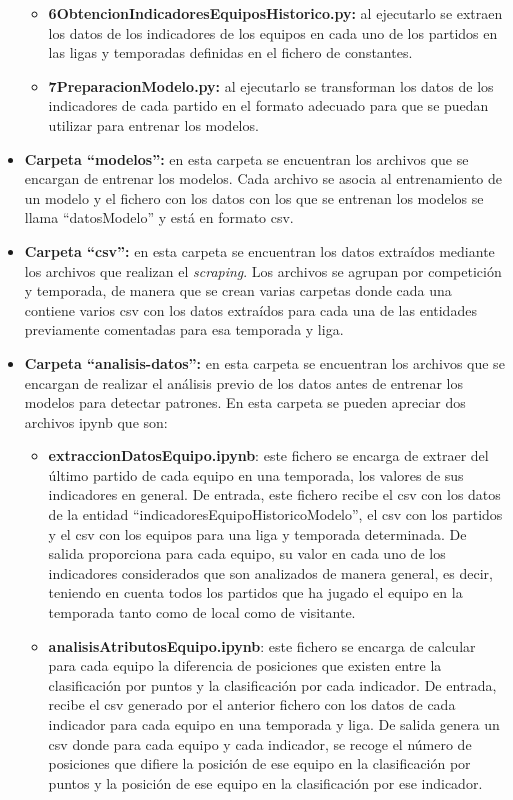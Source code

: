 \begin{itemize}
\begin{itemize}
              \item \textbf{6ObtencionIndicadoresEquiposHistorico.py:} al ejecutarlo se extraen los datos de los indicadores de los equipos en cada uno de los partidos en las ligas y temporadas definidas en el fichero de constantes.
              \item \textbf{7PreparacionModelo.py:} al ejecutarlo se transforman los datos de los indicadores de cada partido en el formato adecuado para que se puedan utilizar para entrenar los modelos.
          \end{itemize}
    \item \textbf{Carpeta ``modelos'':} en esta carpeta se encuentran los archivos que se encargan de entrenar los modelos. Cada archivo se asocia al entrenamiento de un modelo y el fichero con los datos con los que se entrenan los modelos se llama ``datosModelo'' y está en formato csv.
    \item \textbf{Carpeta ``csv'':} en esta carpeta se encuentran los datos extraídos mediante los archivos que realizan el \textit{scraping}. Los archivos se agrupan por competición y temporada, de manera que se crean varias carpetas donde cada una contiene varios csv con los datos extraídos para cada una de las entidades previamente comentadas para esa temporada y liga.
    \item \textbf{Carpeta ``analisis-datos'':} en esta carpeta se encuentran los archivos que se encargan de realizar el análisis previo de los datos antes de entrenar los modelos para detectar patrones. En esta carpeta se pueden apreciar dos archivos ipynb que son:
          \begin{itemize}
              \item \textbf{extraccionDatosEquipo.ipynb}: este fichero se encarga de extraer del último partido de cada equipo en una temporada, los valores de sus indicadores en general. De entrada, este fichero recibe el csv con los datos de la entidad ``indicadoresEquipoHistoricoModelo'', el csv con los partidos y el csv con los equipos para una liga y temporada determinada. De salida proporciona para cada equipo, su valor en cada uno de los indicadores considerados que son analizados de manera general, es decir, teniendo en cuenta todos los partidos que ha jugado el equipo en la temporada tanto como de local como de visitante.
              \item \textbf{analisisAtributosEquipo.ipynb}: este fichero se encarga de calcular para cada equipo la diferencia de posiciones que existen entre la clasificación por puntos y la clasificación por cada indicador. De entrada, recibe el csv generado por el anterior fichero con los datos de cada indicador para cada equipo en una temporada y liga. De salida genera un csv donde para cada equipo y cada indicador, se recoge el número de posiciones que difiere la posición de ese equipo en la clasificación por puntos y la posición de ese equipo en la clasificación por ese indicador.
          \end{itemize}
\end{itemize}


